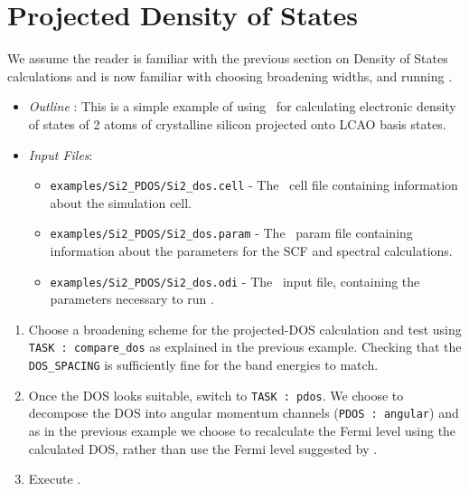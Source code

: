 \documentclass[a4paper,11pt,twoside]{book}
\begin{document}
{\section{Projected Density of States}
We assume the reader is familiar with the previous section on Density of States calculations and is now familiar with choosing broadening widths, and running \optados.
\begin{itemize}
\item \emph{Outline} : This is a simple example of using \optados\ for calculating electronic density of states of 2 atoms of crystalline silicon projected onto LCAO basis states.
\item \emph{Input Files}:
\begin{itemize}
\item \verb#examples/Si2_PDOS/Si2_dos.cell# - The \castep\ cell file containing information about the simulation cell.
\item \verb#examples/Si2_PDOS/Si2_dos.param# - The \castep\ param file containing information about the parameters for the SCF and spectral calculations.
\item \verb#examples/Si2_PDOS/Si2_dos.odi# - The \optados\ input file, containing the parameters necessary to run \optados.
\end{itemize}
\end{itemize}

\begin{enumerate}

\item Choose a broadening scheme for the projected-DOS calculation and test using {\tt TASK : compare\_dos} as explained in the previous example. Checking that the  {\tt DOS\_SPACING} is sufficiently fine for the band energies to match.

\item Once the DOS looks suitable, switch to  {\tt TASK : pdos}. We choose to decompose the DOS into angular momentum channels ({\tt PDOS : angular}) and as in the previous example we choose to recalculate the Fermi level using the calculated DOS, rather than use the Fermi level suggested by \castep.

\item Execute \optados.


\end{enumerate}}
\end{document}

